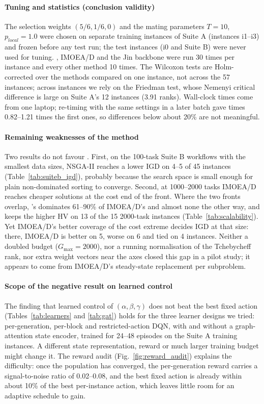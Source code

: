 \paragraph{Tuning and statistics (conclusion validity)}
The selection weights $(5/6, 1/6, 0)$ and the mating parameters $T = 10$, $p_{local} = 1.0$ were chosen on separate
training instances of Suite A (instances i1--i3) and frozen before any test run; the test instances (i0 and Suite B)
were never used for tuning. \ours{}, IMOEA/D and the Jin backbone were run 30 times per instance and every other
method 10 times. The Wilcoxon tests are Holm-corrected over the methods compared on one instance, not across the 57
instances; across instances we rely on the Friedman test, whose Nemenyi critical difference is large on Suite A's 12
instances (3.91 ranks). Wall-clock times come from one laptop; re-timing \ours{} with the same settings in a later batch gave times 0.82--1.21
times the first ones, so differences below about 20\% are not meaningful.

\paragraph{Remaining weaknesses of the method}
Two results do not favour \ours{}. First, on the 100-task Suite B workflows with the smallest data sizes, NSGA-II
reaches a lower IGD on 4--5 of 45 instances (Table~\ref{tab:suiteb_igd}), probably because the search space is small
enough for plain non-dominated sorting to converge. Second, at 1000--2000 tasks IMOEA/D reaches cheaper solutions
at the cost end of the front. Where the two fronts overlap, \ours{}'s dominates 61--90\% of IMOEA/D's and almost none
the other way, and \ours{} keeps the higher HV on 13 of the 15 2000-task instances (Table~\ref{tab:scalability}). Yet
IMOEA/D's better coverage of the cost extreme decides IGD at that size: there, IMOEA/D is better on 5, worse on 6
and tied on 4 instances. Neither a doubled budget ($G_{\max} = 2000$), nor a running normalisation of the Tchebycheff
rank, nor extra weight vectors near the axes closed this gap in a pilot study; it appears to come from IMOEA/D's
steady-state replacement per subproblem.

\paragraph{Scope of the negative result on learned control}
The finding that learned control of $(\alpha, \beta, \gamma)$ does not beat the best fixed action
(Tables~\ref{tab:learners} and \ref{tab:gat}) holds for the three learner designs we tried: per-generation, per-block
and restricted-action DQN, with and without a graph-attention state encoder, trained for 24--48 episodes on the
Suite A training instances. A different state representation, reward or much larger training budget might change it.
The reward audit (Fig.~\ref{fig:reward_audit}) explains the difficulty: once the population has converged, the
per-generation reward carries a signal-to-noise ratio of 0.02--0.08, and the best fixed action is already within
about 10\% of the best per-instance action, which leaves little room for an adaptive schedule to gain.
